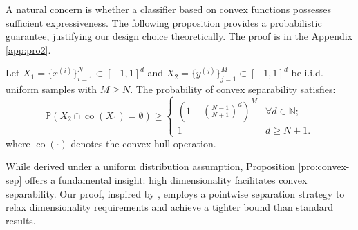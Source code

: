\documentclass[journal]{IEEEtran}
\begin{document}
A natural concern is whether a classifier based on convex functions possesses sufficient expressiveness. The following proposition provides a probabilistic guarantee, justifying our design choice theoretically. The proof is in the Appendix \ref{app:pro2}. 
\begin{proposition}\label{pro:convex-sep}
	Let $X_1 = \{x^{(i)}\}_{i=1}^N \subset [-1,1]^d$ and $X_2 = \{y^{(j)}\}_{j=1}^M \subset [-1,1]^d$ be i.i.d. uniform samples with $M \ge N$. The probability of convex separability satisfies:
	\begin{equation}
		\mathbb{P}\left(X_2 \cap \operatorname{co}(X_1) = \emptyset \right) \geq 
		\begin{cases} 
			{\left( {1 - {{\left( {\frac{{N - 1}}{{N + 1}}} \right)}^d}} \right)^M}& \forall d \in \mathbb{N}; \\
			1 & d \ge N+1. 
		\end{cases} \nonumber
	\end{equation}
	where $\operatorname{co}(\cdot)$ denotes the convex hull operation.
\end{proposition}
While derived under a uniform distribution assumption, Proposition \ref{pro:convex-sep} offers a fundamental insight: high dimensionality facilitates convex separability. Our proof, inspired by \cite{NEURIPS2023_a45b205c}, employs a pointwise separation strategy to relax dimensionality requirements and achieve a tighter bound than standard results.
\end{document}
